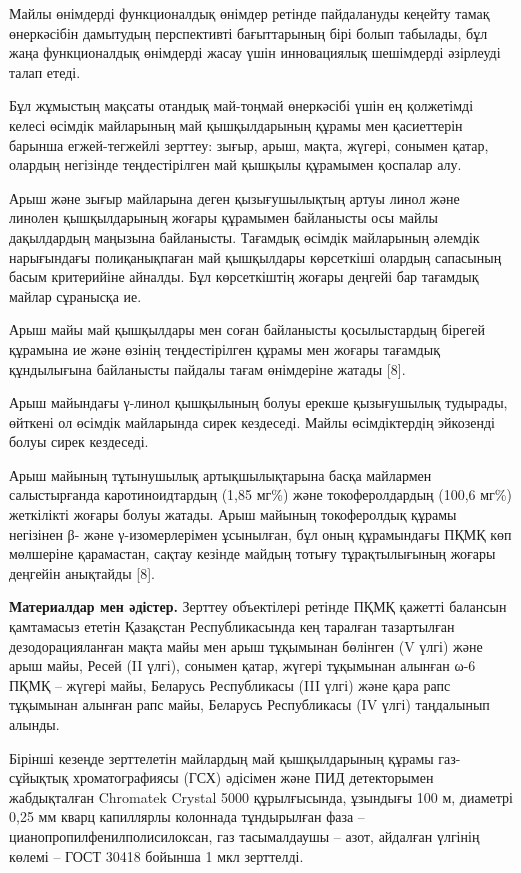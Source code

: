 Майлы өнімдерді функционалдық өнімдер ретінде пайдалануды кеңейту тамақ
өнеркәсібін дамытудың перспективті бағыттарының бірі болып табылады, бұл
жаңа функционалдық өнімдерді жасау үшін инновациялық шешімдерді
әзірлеуді талап етеді.

Бұл жұмыстың мақсаты отандық май-тоңмай өнеркәсібі үшін ең қолжетімді
келесі өсімдік майларының май қышқылдарының құрамы мен қасиеттерін
барынша егжей-тегжейлі зерттеу: зығыр, арыш, мақта, жүгері, сонымен
қатар, олардың негізінде теңдестірілген май қышқылы құрамымен қоспалар
алу.

Арыш және зығыр майларына деген қызығушылықтың артуы линол және линолен
қышқылдарының жоғары құрамымен байланысты осы майлы дақылдардың маңызына
байланысты. Тағамдық өсімдік майларының әлемдік нарығындағы
полиқанықпаған май қышқылдары көрсеткіші олардың сапасының басым
критерийіне айналды. Бұл көрсеткіштің жоғары деңгейі бар тағамдық майлар
сұранысқа ие.

Арыш майы май қышқылдары мен соған байланысты қосылыстардың бірегей
құрамына ие және өзінің теңдестірілген құрамы мен жоғары тағамдық
құндылығына байланысты пайдалы тағам өнімдеріне жатады {[}8{]}.

Арыш майындағы γ-линол қышқылының болуы ерекше қызығушылық тудырады,
өйткені ол өсімдік майларында сирек кездеседі. Майлы өсімдіктердің
эйкозенді болуы сирек кездеседі.

Арыш майының тұтынушылық артықшылықтарына басқа майлармен салыстырғанда
каротиноидтардың (1,85 мг\%) және токоферолдардың (100,6 мг\%)
жеткілікті жоғары болуы жатады. Арыш майының токоферолдық құрамы
негізінен β- және γ-изомерлерімен ұсынылған, бұл оның құрамындағы ПҚМҚ
көп мөлшеріне қарамастан, сақтау кезінде майдың тотығу тұрақтылығының
жоғары деңгейін анықтайды {[}8{]}.

{\bfseries Материалдар мен әдістер.} Зерттеу объектілері ретінде ПҚМҚ
қажетті балансын қамтамасыз ететін Қазақстан Республикасында кең
таралған тазартылған дезодорацияланған мақта майы мен арыш тұқымынан
бөлінген (V үлгі) және арыш майы, Ресей (II үлгі), сонымен қатар, жүгері
тұқымынан алынған ω-6 ПҚМҚ -- жүгері майы, Беларусь Республикасы (III
үлгі) және қара рапс тұқымынан алынған рапс майы, Беларусь Республикасы
(IV үлгі) таңдалынып алынды.

Бірінші кезеңде зерттелетін майлардың май қышқылдарының құрамы
газ-сұйықтық хроматографиясы (ГСХ) әдісімен және ПИД детекторымен
жабдықталған Chromatek Crystal 5000 құрылғысында, ұзындығы 100 м,
диаметрі 0,25 мм кварц капиллярлы колоннада тұндырылған фаза --
цианопропилфенилполисилоксан, газ тасымалдаушы -- азот, айдалған үлгінің
көлемі -- ГОСТ 30418 бойынша 1 мкл зерттелді.

